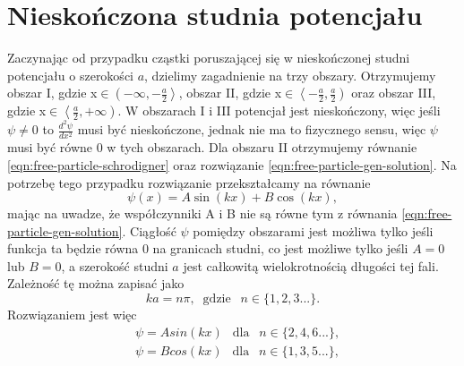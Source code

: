 \documentclass{SGGW-thesis}
\begin{document}
	\section{Nieskończona studnia potencjału}
	Zaczynając od przypadku cząstki poruszającej się w nieskończonej studni potencjału o szerokości $a$, dzielimy zagadnienie na trzy obszary. Otrzymujemy obszar I, gdzie x$\in\left(-\infty,-\frac{a}{2}\right>$, obszar II, gdzie x$\in\left<-\frac{a}{2}, \frac{a}{2}\right)$ oraz obszar III, gdzie x$\in\left<\frac{a}{2}, +\infty\right)$. W obszarach I i III potencjał jest nieskończony, więc jeśli $\psi\neq0$ to $\frac{d^2\psi}{dx^2}$ musi być nieskończone, jednak nie ma to fizycznego sensu, więc $\psi$ musi być równe 0 w tych obszarach. Dla obszaru II otrzymujemy równanie \ref{eqn:free-particle-schrodigner} oraz rozwiązanie \ref{eqn:free-particle-gen-solution}. Na potrzebę tego przypadku rozwiązanie przekształcamy na równanie
	\begin{equation}
	\psi(x) = A\sin(kx) + B\cos(kx),
	\end{equation}
mając na uwadze, że współczynniki A i B nie są równe tym z równania \ref{eqn:free-particle-gen-solution}. Ciągłość $\psi$ pomiędzy obszarami jest możliwa tylko jeśli funkcja ta będzie równa 0 na granicach studni, co jest możliwe tylko jeśli $A=0$ lub $B=0$, a szerokość studni $a$ jest całkowitą wielokrotnością długości tej fali. Zależność tę można zapisać jako
	\begin{equation}
	ka=n\pi, \;\;\textrm{gdzie}\;\;\ n\in\{1, 2, 3...\}.
	\end{equation}
Rozwiązaniem jest więc
	\begin{equation}\label{eqn:well-inside-sol}
	\begin{split}
		&\psi = Asin(kx) \;\;\ \textrm{dla} \;\;\ n\in\{2, 4, 6...\}, \\
		&\psi = Bcos(kx) \;\;\ \textrm{dla} \;\;\ n\in\{1, 3, 5...\},
	\end{split}
	\end{equation}
\end{document}
